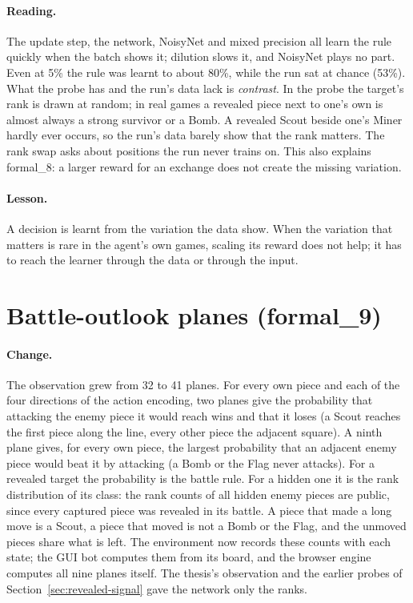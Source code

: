\paragraph{Reading.} The update step, the network, NoisyNet and mixed precision all learn the rule
quickly when the batch shows it; dilution slows it, and NoisyNet plays no part. Even at 5\% the
rule was learnt to about 80\%, while the run sat at chance (53\%). What the probe has and the run's
data lack is \emph{contrast}. In the probe the target's rank is drawn at random; in real games a
revealed piece next to one's own is almost always a strong survivor or a Bomb. A revealed Scout
beside one's Miner hardly ever occurs, so the run's data barely show that the rank matters. The
rank swap asks about positions the run never trains on. This also explains formal\_8: a larger
reward for an exchange does not create the missing variation.

\paragraph{Lesson.} A decision is learnt from the variation the data show. When the variation that
matters is rare in the agent's own games, scaling its reward does not help; it has to reach the
learner through the data or through the input.

\section{Battle-outlook planes (formal\_9)}
\label{sec:outlook}

\paragraph{Change.} The observation grew from 32 to 41 planes. For every own piece and each of
the four directions of the action encoding, two planes give the probability that attacking the
enemy piece it would reach wins and that it loses (a Scout reaches the first piece along the
line, every other piece the adjacent square). A ninth plane gives, for every own piece, the
largest probability that an adjacent enemy piece would beat it by attacking (a Bomb or the Flag
never attacks). For a revealed target the probability is the battle rule. For a hidden one it is
the rank distribution of its class: the rank counts of all hidden enemy pieces are public, since
every captured piece was revealed in its battle. A piece that made a long move is a Scout, a piece
that moved is not a Bomb or the Flag, and the unmoved pieces share what is left. The environment
now records these counts with each state; the GUI bot computes them from its board, and the
browser engine computes all nine planes itself. The thesis's observation and the earlier probes
of Section~\ref{sec:revealed-signal} gave the network only the ranks.

